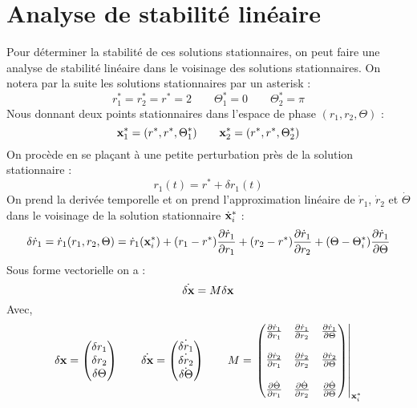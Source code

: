\section{Analyse de stabilité linéaire}
%
Pour déterminer la stabilité de ces solutions stationnaires, on peut faire une analyse de stabilité linéaire dans le voisinage des solutions stationnaires. On notera par la suite les solutions stationnaires par un asterisk :
%
\begin{equation*}
    r_1^* = r_2^* = r^* = 2
    \qquad
    \Theta_1^* = 0
    \qquad
    \Theta_2^* = \pi
\end{equation*}
%
Nous donnant deux points stationnaires dans l'espace de phase $(r_1, r_2, \Theta)$ :
%
\begin{equation}
    \vb{x}_1^* = (r^*, r^*, \Theta_1^*)
    \qquad
    \vb{x}_2^* = (r^*, r^*, \Theta_2^*)
\end{equation}
%
On procède en se plaçant à une petite perturbation près de la solution stationnaire :
%
\begin{equation}
    r_1(t) = r^* + \delta r_1(t)
\end{equation}
%
On prend la derivée temporelle et on prend l'approximation linéaire de $\dot{r}_1$, $\dot{r}_2$ et $\dot{\Theta}$ dans le voisinage de la solution stationnaire $\dot{\vb{x}}^*_i$ :
%
\begin{dmath}
    \delta \dot{r}_1 = \dot{r}_1(r_1, r_2, \Theta)
    = \dot{r}_1(\vb{x}_i^*) 
    + (r_1 - r^*)\pdv{\dot{r}_1}{r_1} + (r_2 - r^*)\pdv{\dot{r}_1}{r_2} + (\Theta - \Theta_i^*)\pdv{\dot{r}_1}{\Theta}
\end{dmath}
%
Sous forme vectorielle on a :
%
\begin{equation}
    \dot{\delta \vb{x}} = M \delta \vb{x}
\end{equation}
%
Avec,
%
\begin{equation}
    \delta \vb{x} = 
    \begin{pmatrix}
        \delta r_1 \\
        \delta r_2 \\
        \delta \Theta \\
    \end{pmatrix}
    \qquad
    \dot{\delta \vb{x}} =
    \begin{pmatrix}
        \dot{\delta r_1} \\
        \dot{\delta r_2} \\
        \dot{\delta \Theta}
    \end{pmatrix}
    \qquad
    M =
    \left. \begin{pmatrix}
        \pdv{\dot{r}_1}{r_1} & \pdv{\dot{r}_1}{r_2} & \pdv{\dot{r}_1}{\Theta} \\
        \\
        \pdv{\dot{r}_2}{r_1} & \pdv{\dot{r}_2}{r_2} & \pdv{\dot{r}_2}{\Theta} \\
        \\
        \pdv{\dot{\Theta}}{r_1} & \pdv{\dot{\Theta}}{r_2} & \pdv{\dot{\Theta}}{\Theta}
    \end{pmatrix}\right|_{\vb{x}_i^*}
    \label{eq:slow_flow}
\end{equation}
